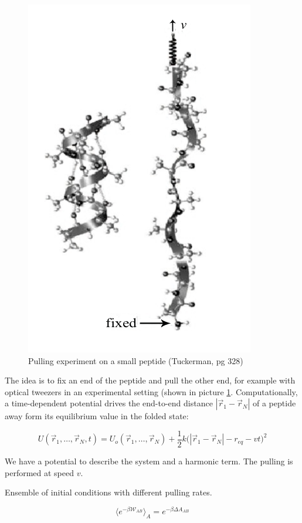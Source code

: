 \begin{figure}[H]
		\centering
		\includegraphics[scale=0.5]{pulling}
		\caption{Pulling experiment on a small peptide (Tuckerman, pg 328)}
		\label{fig:pulling}
	\end{figure}

The idea is to fix an end of the peptide and pull the other end, for example with optical tweezers in an experimental setting (shown in picture \ref{fig:pulling}.
Computationally, a time-dependent potential drives the end-to-end distance $|\vec{r}_1-\vec{r}_N|$ of a peptide away form its equilibrium value in the folded state:

$$U(\vec{r}_1, \dots, \vec{r}_N, t) = U_o(\vec{r}_1, \dots, \vec{r}_N) + \frac{1}{2}k\bigl(|\vec{r}_1-\vec{r}_N|-r_{eq}-vt\bigr)^2$$

We have a potential to describe the system and a harmonic term.
The pulling is performed at speed $v$.

Ensemble of initial conditions with different pulling rates.

$$\langle e^{-\beta\mathcal{W}_{AB}}\rangle_A = e^{-\beta\Delta A_{AB}}$$

